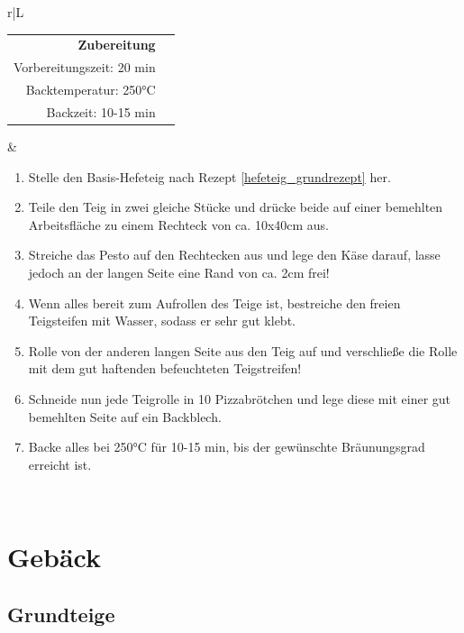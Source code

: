 \documentclass[a4paper, 12pt]{scrbook} 								%
\numberwithin{equation}{section} 									%
\begin{document}
	\newpage
	\begin{tabularx}{\textwidth}{r|L}

									
		\begin{tabular}[t]{rr}
			\textbf{Zubereitung}	\\
			Vorbereitungszeit: 20 min	\\
			Backtemperatur: 250°C	\\
			Backzeit: 10-15 min
		\end{tabular}			&	\begin{enumerate}[]
										\item Stelle den Basis-Hefeteig nach Rezept \ref{hefeteig_grundrezept} her.
										\item Teile den Teig in zwei gleiche Stücke und drücke beide auf einer bemehlten Arbeitsfläche zu einem Rechteck von ca. 10x40cm aus.
										\item Streiche das Pesto auf den Rechtecken aus und lege den Käse darauf, lasse jedoch an der langen Seite eine Rand von ca. 2cm frei!
										\item Wenn alles bereit zum Aufrollen des Teige ist, bestreiche den freien Teigsteifen mit Wasser, sodass er sehr gut klebt.
										\item Rolle von der anderen langen Seite aus den Teig auf und verschließe die Rolle mit dem gut haftenden befeuchteten Teigstreifen!
										\item Schneide nun jede Teigrolle in 10 Pizzabrötchen und lege diese mit einer gut bemehlten Seite auf ein Backblech.
										\item Backe alles bei 250°C für 10-15 min, bis der gewünschte Bräunungsgrad erreicht ist.
									\end{enumerate}	\\
	\end{tabularx}
	\newpage


\chapter{Gebäck}
\newpage


	\section{Grundteige}
	\newpage
\end{document}
